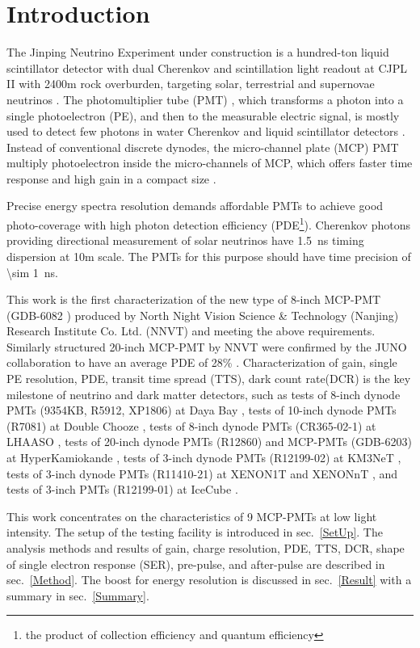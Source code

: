 \section{Introduction}
The Jinping Neutrino Experiment under construction is a hundred-ton liquid scintillator detector with dual Cherenkov and scintillation light readout
 at CJPL II with 2400m rock overburden, targeting solar, terrestrial and supernovae neutrinos \cite{LetterJNE2017}.
The photomultiplier tube (PMT) \cite{HAMAMATSUManual}, which transforms a photon into a single photoelectron (PE), and then to the measurable electric signal, is mostly used to detect few photons in water Cherenkov \cite{SNO,SuperK} and liquid scintillator detectors \cite{KamLAND,JUNO:2015zny}. Instead of conventional discrete dynodes, the micro-channel plate (MCP) PMT multiply photoelectron inside the micro-channels of MCP, which offers faster time response and high gain in a compact size \cite{HAMAMATSUManual}.

Precise energy spectra resolution demands affordable PMTs to achieve good photo-coverage with high photon detection efficiency (PDE\footnote{the product of collection efficiency and quantum efficiency}). Cherenkov photons providing directional measurement of solar neutrinos have \SI{1.5}{ns} timing dispersion at 10m scale. The PMTs for this purpose should have time precision of \SI{\sim 1}{ns}.


This work is the first characterization of
 the new type of 8-inch MCP-PMT (GDB-6082 \cite{GDB-6082}) produced by North Night Vision Science \& Technology (Nanjing) Research Institute Co. Ltd. (NNVT) and meeting the above requirements. %
Similarly structured 20-inch MCP-PMT by NNVT were confirmed by the JUNO collaboration to have an average PDE of 28\% \cite{JUNOMassTesting}.
Characterization of gain, single PE resolution, PDE, transit time spread (TTS), dark count rate(DCR) is the key milestone of neutrino and dark matter detectors, such as tests of
 8-inch dynode PMTs (9354KB, R5912, XP1806) at Daya Bay \cite{DayaBayTesting}, tests of 10-inch dynode PMTs (R7081) at Double Chooze \cite{DoubleChoozeTesting}, tests of 8-inch dynode PMTs (CR365-02-1) at LHAASO \cite{LHAASOTesting}, tests of 20-inch dynode PMTs (R12860) and MCP-PMTs (GDB-6203) at HyperKamiokande \cite{HyperKTesting}, tests of 3-inch dynode PMTs (R12199-02) at KM3NeT \cite{KM3NetTesting}, tests of 3-inch dynode PMTs (R11410-21) at XENON1T and XENONnT \cite{XENON1TTesting}\cite{XENONnTTesting}, and tests of 3-inch PMTs (R12199-01) at IceCube \cite{IceCubeTesting}.

This work concentrates on the characteristics of 9 MCP-PMTs at low light intensity. The setup of the testing facility is introduced in sec.~\ref{SetUp}. The analysis methods and results of gain, charge resolution, PDE, TTS, DCR, shape of single electron response (SER), pre-pulse, and after-pulse are described in sec.~\ref{Method}. The boost for energy resolution is discussed in sec.~\ref{Result} with a summary in sec.~\ref{Summary}.

